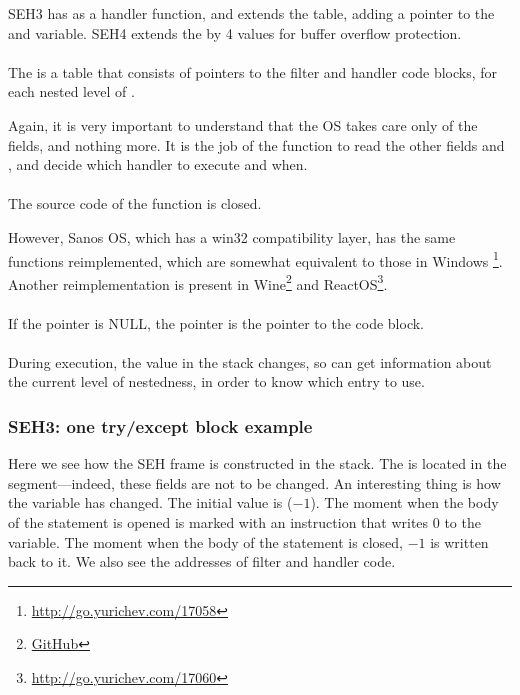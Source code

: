 SEH3 has  
as a handler function, and extends the  table, adding
a pointer to the  and  variable.
SEH4 extends the  
by 4 values for buffer overflow protection.\\
\\
The  is a table that consists of pointers to the filter and handler code blocks, for each nested level of .



Again, it is very important to understand that the \ac{OS} takes care only of the  fields, and nothing more.
It is the job of the  function to read the other fields and , and decide
which handler to execute and when.\\
\\
The source code of the  function is closed.

However, Sanos OS, which has a win32 compatibility layer, has the same
functions reimplemented, which are somewhat equivalent to those in Windows
\footnote{\url{http://go.yurichev.com/17058}}.
Another reimplementation is present in 
Wine\footnote{\href{http://go.yurichev.com/17059}{GitHub}}
and ReactOS\footnote{\url{http://go.yurichev.com/17060}}.\\
\\
If the  pointer is NULL, the  
pointer is the pointer to the  code block.\\
\\
During execution, the  value in the stack changes, so
 can get information about the current level of nestedness, 
in order to know which  entry to use.

\subsubsection{SEH3: one try/except block example}





Here we see how the SEH frame is constructed in the stack.
The  is located in the  segment---indeed, these fields are not to be changed.
An interesting thing is how the  variable has changed.
The initial value is  ($-1$).
The moment when the body of the  
statement is opened is marked with an instruction that writes 0 to the variable.
The moment when the body of the  statement is closed, $-1$ 
is written back to it.
We also see the addresses of filter and handler code.

